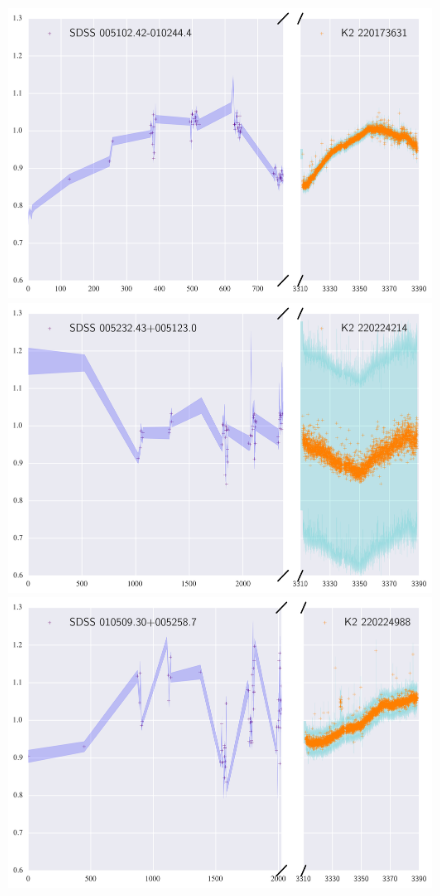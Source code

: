 \documentclass[a4paper,fleqn,usenatbib]{mnras}
\begin{document}
 \begin{figure}
 	\includegraphics[width=\columnwidth]{220173631ExtendedLC.png}
 	\includegraphics[width=\columnwidth]{220224214ExtendedLC.png}
 	\includegraphics[width=\columnwidth]{220224988ExtendedLC.png}
 	\caption{}
 	\label{fig:example_figure}
 \end{figure}
 
\end{document}
